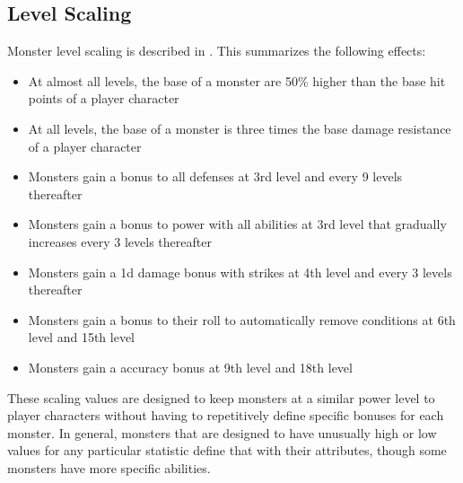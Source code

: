    \subsection{Level Scaling}
        Monster level scaling is described in .
        This summarizes the following effects:
        \begin{itemize}
            \item At almost all levels, the base  of a monster are 50\% higher than the base hit points of a player character
            \item At all levels, the base  of a monster is three times the base damage resistance of a player character
            \item Monsters gain a  bonus to all defenses at 3rd level and every 9 levels thereafter
            \item Monsters gain a  bonus to power with all abilities at 3rd level that gradually increases every 3 levels thereafter
            \item Monsters gain a \plus1d damage bonus with strikes at 4th level and every 3 levels thereafter
            \item Monsters gain a  bonus to their roll to automatically remove conditions at 6th level and 15th level
            \item Monsters gain a  accuracy bonus at 9th level and 18th level
        \end{itemize}
        These scaling values are designed to keep monsters at a similar power level to player characters without having to repetitively define specific bonuses for each monster.
        In general, monsters that are designed to have unusually high or low values for any particular statistic define that with their attributes, though some monsters have more specific abilities.

